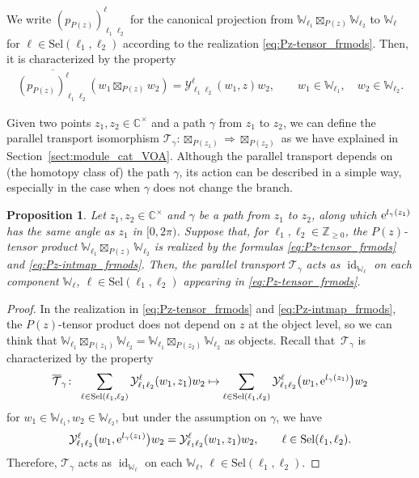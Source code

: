 \documentclass[10pt,a4paper]{amsart}
\numberwithin{equation}{section}
\newtheorem{prop}[thm]{Proposition}
 { \theoremstyle{definition}
\newtheorem{defn}[thm]{Definition}
\newtheorem{Note}[thm]{Note}
\newtheorem{exam}[thm]{Example}
\newtheorem{rem}[thm]{Remark} }
\newcommand{\ol}[1]{\overline{#1}}
\newcommand{\id}{\operatorname{id}}
\newcommand{\bC}{\mathbb{C}}
\newcommand{\bZ}{\mathbb{Z}}
\newcommand{\cT}{\mathcal{T}}
\newcommand{\Sel}{\mathrm{Sel}}
\newcommand{\voaint}{\mathcal{Y}}
\newcommand{\vmodvec}{w}
\newcommand{\virmod}{\mathbb{W}}
\newcommand{\pzproj}[4]{(p_{P(#1)})_{#2 #3}^{#4}}
\begin{document}
We write $\pzproj{z}{\ell_{1}}{\ell_{2}}{\ell}$ for the canonical projection from $\virmod_{\ell_{1}}\boxtimes_{P(z)}\virmod_{\ell_{2}}$ to $\virmod_{\ell}$ for $\ell\in \Sel (\ell_{1},\ell_{2})$ according to the realization \eqref{eq:Pz-tensor_frmods}.
Then, it is characterized by the property
\begin{gather*}
 \ol{\pzproj{z}{\ell_{1}}{\ell_{2}}{\ell}} (\vmodvec_{1}\boxtimes_{P(z)}\vmodvec_{2})=\voaint_{\ell_{1} \ell_{2}}^{\ell}(\vmodvec_{1},z)\vmodvec_{2},\qquad \vmodvec_{1}\in\virmod_{\ell_{1}}, \quad \vmodvec_{2}\in\virmod_{\ell_{2}}.
\end{gather*}

Given two points $z_{1},z_{2}\in \bC^{\times}$ and a path $\gamma$ from $z_{1}$ to $z_{2}$, we can define the parallel transport isomorphism $\cT_{\gamma}\colon \boxtimes_{P(z_{1})}\Rightarrow \boxtimes_{P(z_{2})}$ as we have explained in Section~\ref{sect:module_cat_VOA}.
Although the parallel transport depends on (the homotopy class of) the path $\gamma$, its action can be described in a simple way, especially in the case when $\gamma$ does not change the branch.

\begin{prop}
\label{prop:triviality_parallel_transport}
Let $z_{1},z_{2}\in \bC^{\times}$ and $\gamma$ be a path from $z_{1}$ to $z_{2}$, along which ${\rm e}^{l_{\gamma}(z_{1})}$ has the same angle as $z_{1}$ in $[0,2\pi)$.
Suppose that, for $\ell_{1},\ell_{2}\in \bZ_{\geq 0}$, the $P(z)$-tensor product $\virmod_{\ell_{1}}\boxtimes_{P(z)}\virmod_{\ell_{2}}$ is realized by the formulas \eqref{eq:Pz-tensor_frmods} and \eqref{eq:Pz-intmap_frmods}.
Then, the parallel transport $\cT_{\gamma}$ acts as $\id_{\virmod_{\ell}}$ on each component $\virmod_{\ell}$, $\ell\in \Sel(\ell_{1},\ell_{2})$ appearing in \eqref{eq:Pz-tensor_frmods}.
\end{prop}
\begin{proof}
In the realization in \eqref{eq:Pz-tensor_frmods} and \eqref{eq:Pz-intmap_frmods}, the $P(z)$-tensor product does not depend on $z$ at the object level, so we can think that $\virmod_{\ell_{1}}\boxtimes_{P(z_{1})}\virmod_{\ell_{2}}=\virmod_{\ell_{1}}\boxtimes_{P(z_{2})}\virmod_{\ell_{2}}$ as objects.
Recall that~$\cT_{\gamma}$ is characterized by the property
\begin{gather*}
 \ol{\cT}_{\gamma}\colon\ \sum_{\ell\in\Sel(\ell_{1},\ell_{2})}\voaint_{\ell_{1} \ell_{2}}^{\ell}(\vmodvec_{1},z_{1})\vmodvec_{2}\mapsto \sum_{\ell\in\Sel(\ell_{1},\ell_{2})}\voaint_{\ell_{1} \ell_{2}}^{\ell}\big(\vmodvec_{1},{\rm e}^{l_{\gamma}(z_{1})}\big)\vmodvec_{2}
\end{gather*}
for $\vmodvec_{1}\in\virmod_{\ell_{1}}, \vmodvec_{2}\in\virmod_{\ell_{2}}$,
but under the assumption on $\gamma$, we have
\begin{gather*}
 \voaint_{\ell_{1} \ell_{2}}^{\ell}\big(\vmodvec_{1},{\rm e}^{l_{\gamma}(z_{1})}\big)\vmodvec_{2}=\voaint_{\ell_{1} \ell_{2}}^{\ell}(\vmodvec_{1},z_{1})\vmodvec_{2},\qquad \ell\in \Sel (\ell_{1},\ell_{2}).
\end{gather*}
Therefore, $\cT_{\gamma}$ acts as $\id_{\virmod_{\ell}}$ on each $\virmod_{\ell}$, $\ell\in\Sel (\ell_{1},\ell_{2})$.
\end{proof}
\end{document}
